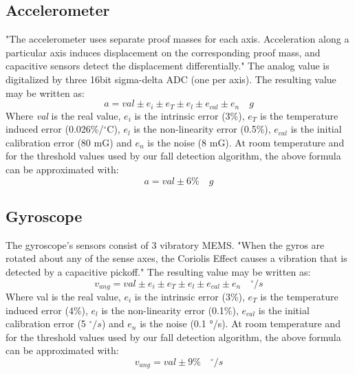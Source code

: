 \documentclass[conference,12pt]{IEEETran}
\begin{document}
\subsection{Accelerometer}
"The accelerometer uses separate proof masses for each axis. Acceleration along a particular axis induces displacement on the corresponding proof mass, and capacitive sensors detect the displacement differentially." The analog value is digitalized by three 16bit sigma-delta ADC (one per axis). The resulting value may be written as:
$$ a = val \pm e_i \pm e_T \pm e_l \pm e_{cal} \pm e_n \quad g $$
Where \textit{val} is the real value, $e_i$ is the intrinsic error (3\%), $e_T$ is the temperature induced error (0.026\%/$^{\circ}$C), $e_l$ is the non-linearity error (0.5\%), $e_{cal}$ is the initial calibration error (80 mG) and $e_n$ is the noise (8 mG). At room temperature and for the threshold values used by our fall detection algorithm, the above formula can be approximated with:
$$ a = val \pm 6\%  \quad g $$

\subsection{Gyroscope}
The gyroscope’s sensors consist of 3 vibratory MEMS. "When the gyros are rotated about any of the sense axes, the Coriolis Effect causes a vibration that is detected by a capacitive pickoff." The resulting value may be written as:
$$ v_{ang} = val \pm e_i  \pm e_T \pm e_l \pm e_{cal} \pm e_n \quad ^{\circ}/s $$
Where val is the real value, $e_i$ is the intrinsic error (3\%), $e_T$ is the temperature induced error (4\%), $e_l$ is the non-linearity error (0.1\%), $e_{cal}$ is the initial calibration error (5 $^{\circ}/s$) and $e_n$ is the noise (0.1 °/s). At room temperature and for the threshold values used by our fall detection algorithm, the above formula can be approximated with:
$$ v_{ang} = val \pm 9\% \quad ^{\circ}/s $$
\end{document}
